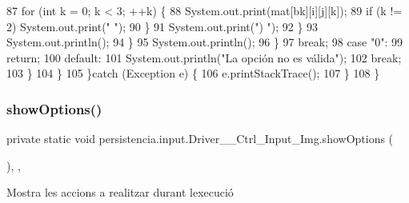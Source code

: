 \begin{DoxyCode}
87                                 \textcolor{keywordflow}{for} (\textcolor{keywordtype}{int} k = 0; k < 3; ++k) \{
88                                     System.out.print(mat[bk][i][j][k]);
89                                     \textcolor{keywordflow}{if} (k != 2) System.out.print(\textcolor{stringliteral}{" "});
90                                 \}
91                                 System.out.print(\textcolor{stringliteral}{")  "});
92                             \}
93                             System.out.println();
94                         \}
95                         System.out.println();
96                     \}
97                 \textcolor{keywordflow}{break};
98                 \textcolor{keywordflow}{case} \textcolor{stringliteral}{"0"}:
99                     \textcolor{keywordflow}{return};
100                 \textcolor{keywordflow}{default}:
101                     System.out.println(\textcolor{stringliteral}{"La opción no es válida"});
102                 \textcolor{keywordflow}{break};
103             \}
104         \}
105     \}\textcolor{keywordflow}{catch} (Exception e) \{
106         e.printStackTrace();
107     \}
108     \}
\end{DoxyCode}
\mbox{\label{classpersistencia_1_1input_1_1Driver____Ctrl__Input__Img_a63892d1060c96a4478541bf0feff579d}} 
\subsubsection{\texorpdfstring{show\+Options()}{showOptions()}}
{\footnotesize\ttfamily private static void persistencia.\+input.\+Driver\+\_\+\+\_\+\+Ctrl\+\_\+\+Input\+\_\+\+Img.\+show\+Options (\begin{DoxyParamCaption}{ }\end{DoxyParamCaption})\hspace{0.3cm}{\ttfamily [inline]}, {\ttfamily [static]}, {\ttfamily [private]}}



Mostra les accions a realitzar durant l\textquotesingle{}execució 


